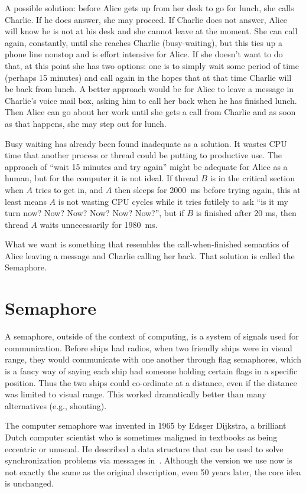 A possible solution: before Alice gets up from her desk to go for lunch, she calls Charlie. If he does answer, she may proceed. If Charlie does not answer, Alice will know he is not at his desk and she cannot leave at the moment. She can call again, constantly, until she reaches Charlie (busy-waiting), but this ties up a phone line nonstop and is effort intensive for Alice. If she doesn't want to do that, at this point she has two options: one is to simply wait some period of time (perhaps 15 minutes) and call again in the hopes that at that time Charlie will be back from lunch. A better approach would be for Alice to leave a message in Charlie's voice mail box, asking him to call her back when he has finished lunch. Then Alice can go about her work until she gets a call from Charlie and as soon as that happens, she may step out for lunch.

Busy waiting has already been found inadequate as a solution. It wastes CPU time that another process or thread could be putting to productive use. The approach of ``wait 15 minutes and try again'' might be adequate for Alice as a human, but for the computer it is not ideal. If thread $B$ is in the critical section when $A$ tries to get in, and $A$ then sleeps for 2000~ms before trying again, this at least means $A$ is not wasting CPU cycles while it tries futilely to ask ``is it my turn now? Now? Now? Now? Now? Now?'', but if $B$ is finished after 20 ms, then thread $A$ waits unnecessarily for 1980~ms. 

What we want is something that resembles the call-when-finished semantics of Alice leaving a message and Charlie calling her back. That solution is called the Semaphore.

\section*{Semaphore}
A semaphore, outside of the context of computing, is a system of signals used for communication. Before ships had radios, when two friendly ships were in visual range, they would communicate with one another through flag semaphores, which is a fancy way of saying each ship had someone holding certain flags in a specific position. Thus the two ships could co-ordinate at a distance, even if the distance was limited to visual range. This worked dramatically better than many alternatives (e.g., shouting).

The computer semaphore was invented in 1965 by Edsger Dijkstra, a brilliant Dutch computer scientist who is sometimes maligned in textbooks as being eccentric or unusual.  He described a data structure that can be used to solve synchronization problems via messages in~\cite{semaphores}. Although the version we use now is not exactly the same as the original description, even 50 years later, the core idea is unchanged.

